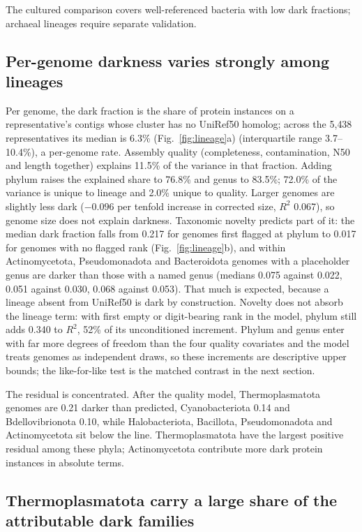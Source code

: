 \documentclass[11pt]{article}
\begin{document}
The cultured comparison covers well-referenced bacteria with low dark
fractions; archaeal lineages require separate validation.

\subsection*{Per-genome darkness varies strongly among lineages}

Per genome, the dark fraction is the share of protein instances on a representative's contigs whose
cluster has no UniRef50 homolog; across the 5{,}438 representatives its median is 6.3\% (Fig.~\ref{fig:lineage}a)
(interquartile range 3.7--10.4\%), a per-genome rate. Assembly quality (completeness, contamination, N50 and length together) explains 11.5\% of the
variance in that fraction. Adding phylum raises the explained share to 76.8\% and genus to 83.5\%;
72.0\% of the variance is unique to lineage and 2.0\% unique to quality.
Larger genomes are slightly less dark ($-0.096$ per tenfold increase in corrected size, $R^2$ 0.067),
so genome size does not explain darkness. Taxonomic novelty predicts part of it: the median dark
fraction falls from 0.217 for genomes first flagged at phylum to 0.017 for genomes with no flagged rank
(Fig.~\ref{fig:lineage}b), and within Actinomycetota, Pseudomonadota and Bacteroidota genomes with a
placeholder genus are darker than those with a named genus (medians 0.075 against 0.022, 0.051
against 0.030, 0.068 against 0.053). That much is expected, because a lineage absent from UniRef50
is dark by construction. Novelty does not absorb the lineage term: with first empty or digit-bearing rank in the
model, phylum still adds 0.340 to $R^2$, 52\% of its unconditioned increment. Phylum and genus enter
with far more degrees of freedom than the four quality covariates and the model treats genomes as
independent draws, so these increments are descriptive upper bounds; the like-for-like test is the
matched contrast in the next section.

The residual is concentrated. After the quality model, Thermoplasmatota genomes are 0.21 darker than
predicted, Cyanobacteriota 0.14 and Bdellovibrionota 0.10, while Halobacteriota, Bacillota,
Pseudomonadota and Actinomycetota sit below the line. Thermoplasmatota have the largest positive residual among these phyla; Actinomycetota contribute more dark protein instances in absolute terms.

\subsection*{Thermoplasmatota carry a large share of the attributable dark families}
\end{document}
